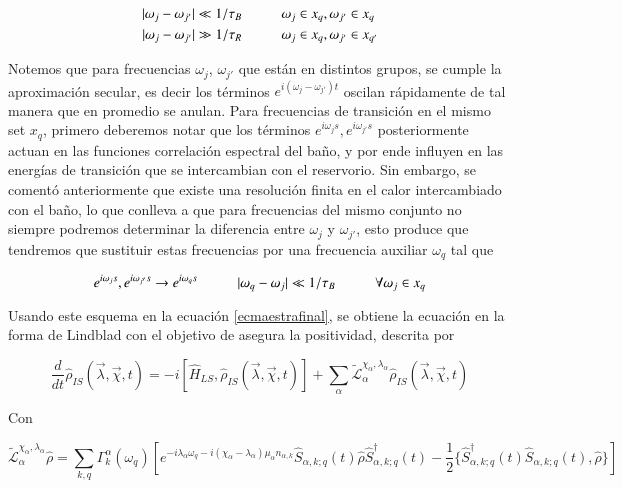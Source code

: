\begin{align*}
    |\omega_{j}-\omega_{j'}| \ll 1/\tau_{B}  &\hspace{10mm} \omega_{j} \in x_{q}, \omega_{j'} \in x_{q} \\
    |\omega_{j}-\omega_{j'}| \gg 1/\tau_{R}  &\hspace{10mm} \omega_{j} \in x_{q}, \omega_{j'} \in x_{q'}
\end{align*}

Notemos que para frecuencias $\omega_{j}$, $\omega_{j'}$ que están en distintos grupos, se cumple la aproximación secular, es decir los términos $e^{i(\omega_{j} - \omega_{j'})t}$ oscilan rápidamente de tal manera que en promedio se anulan. Para frecuencias de transición en el mismo set $x_{q}$, primero deberemos notar que los términos $e^{i\omega_{j}s},e^{i\omega_{j'}s}$ posteriormente actuan en las funciones correlación espectral del baño, y por ende influyen en las energías de transición que se intercambian con el reservorio. Sin embargo, se comentó anteriormente que existe una resolución finita en el calor intercambiado con el baño, lo que conlleva a que para frecuencias del mismo conjunto no siempre podremos determinar la diferencia entre $\omega_{j}$ y $\omega_{j'}$, esto produce que tendremos que sustituir estas frecuencias por una frecuencia auxiliar $\omega_{q}$ tal que

\begin{equation*}
    e^{i\omega_{j}s},e^{i\omega_{j'}s} \to e^{i\omega_{q}s} \hspace{10mm} |\omega_{q} - \omega_{j}| \ll 1/\tau_{B} \hspace{10mm} \forall \omega_{j} \in x_{q} 
\end{equation*}

Usando este esquema en la ecuación \ref{ecmaestrafinal}, se obtiene la ecuación en la forma de Lindblad con el objetivo de asegura la positividad\cite{chruscinski2017brief}, descrita por

\begin{equation*}
    \frac{d}{dt}\hat{\rho}_{IS}(\vec{\lambda},\vec{\chi},t) = -i[\hat{H}_{LS},\hat{\rho}_{IS}(\vec{\lambda},\vec{\chi},t)] + \sum_{\alpha}\tilde{\mathcal{L}}^{\chi_{\alpha},\lambda_{\alpha}}_{\alpha} \hat{\rho}_{IS}(\vec{\lambda},\vec{\chi},t)
\end{equation*}

Con

\begin{equation*}
    \tilde{\mathcal{L}}^{\chi_{\alpha},\lambda_{\alpha}}_{\alpha}\hat{\rho} = \sum_{k,q}\Gamma^{\alpha}_{k}(\omega_{q}) \left[e^{-i\lambda_{\alpha}\omega_{q} - i(\chi_{\alpha}-\lambda_{\alpha})\mu_{\alpha}n_{\alpha,k}}\hat{S}_{\alpha,k;q}(t)\hat{\rho}\hat{S}^{\dagger}_{\alpha,k;q}(t) - \frac{1}{2}\{\hat{S}^{\dagger}_{\alpha,k;q}(t)\hat{S}_{\alpha,k;q}(t),\hat{\rho} \} \right] 
\end{equation*}

